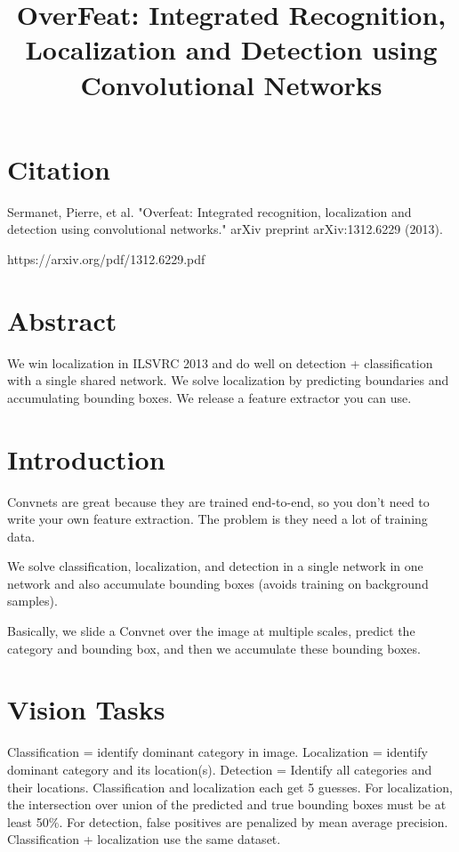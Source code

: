 \documentclass[a4paper]{article}
\title{OverFeat: Integrated Recognition, Localization and Detection using
Convolutional Networks}
\date{}
\begin{document}
\maketitle

\section{Citation}

Sermanet, Pierre, et al. "Overfeat: Integrated recognition, localization and detection using convolutional networks." arXiv preprint arXiv:1312.6229 (2013).

https://arxiv.org/pdf/1312.6229.pdf

\section{Abstract}

We win localization in ILSVRC 2013 and do well on detection + classification
with a single shared network. We solve localization by predicting boundaries
and accumulating bounding boxes. We release a feature extractor you can use.

\section{Introduction}
Convnets are great because they are trained end-to-end, so you don't need to
write your own feature extraction. The problem is they need a lot of training
data.

We solve classification, localization, and detection in a single network in one
network and also accumulate bounding boxes (avoids training on background
samples).

Basically, we slide a Convnet over the image at multiple scales, predict the
category and bounding box, and then we accumulate these bounding boxes.

\section{Vision Tasks}
Classification = identify dominant category in image. Localization = identify
dominant category and its location(s). Detection = Identify all categories and
their locations. Classification and localization each get 5 guesses. For
localization, the intersection over union of the predicted and true bounding
boxes must be at least 50\%. For detection, false positives are penalized by
mean average precision. Classification + localization use the same dataset.
\end{document}
